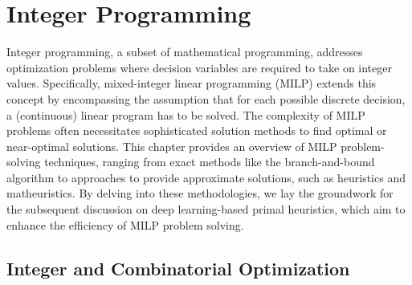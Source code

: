 

\chapter{Integer Programming}\label{chap:integer-programming}


Integer programming, a subset of mathematical programming, addresses optimization problems where decision variables are required to take on integer values.
Specifically, mixed-integer linear programming (MILP) extends this concept by encompassing the assumption that for each possible discrete decision, a (continuous) linear program has to be solved.
The complexity of MILP problems often necessitates sophisticated solution methods to find optimal or near-optimal solutions.
This chapter provides an overview of MILP problem-solving techniques, ranging from exact methods like the branch-and-bound algorithm to approaches to provide approximate solutions, such as heuristics and matheuristics.
By delving into these methodologies, we lay the groundwork for the subsequent discussion on deep learning-based primal heuristics, which aim to enhance the efficiency of MILP problem solving.

\section{Integer and Combinatorial Optimization}

